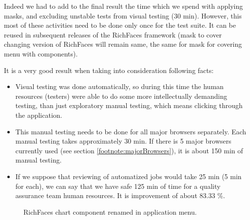 \documentclass[11pt,oneside,final]{fithesis2}
\begin{document}
  Indeed we had to add to the final result the time which we spend with applying masks, and excluding unstable tests from visual
  testing (30 min). However, this most of these activities need to be done only once for the test suite. It can be reused in subsequent
  releases of the RichFaces framework (mask to cover changing version of RichFaces will remain same, the same for mask for covering
  menu with components).
  
  It is a very good result when taking into consideration following facts:
  
  \begin{itemize}
   \item Visual testing was done automatically, so during this time the human resources (testers) were able to do some more 
   intellectually demanding testing, than just exploratory manual testing, which means clicking through the application.
   \item This manual testing needs to be done for all major browsers separately. Each manual testing takes approximately 30 min.
         If there is 5 major browsers currently used (see section \ref{footnote:majorBrowsers}), it is about 150 min of manual testing.
   \item If we suppose that reviewing of automatized jobs would take 25 min (5 min for each), we can say that we have safe
	 125 min of time for a quality assurance team human resources. It is improvement of about 83.33 \%.
  \end{itemize}

  
  \begin{figure}[!htb]
      \begin{center}
      \leavevmode
      \centerline{}
      \end{center}
      \caption{RichFaces chart component renamed in application menu.}
      \label{fig:chartComponentRenamed}
  \end{figure}
  
\end{document}
